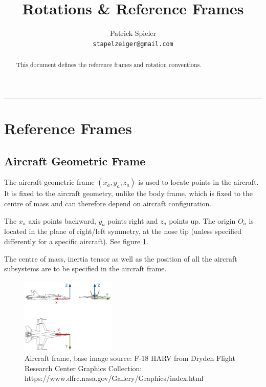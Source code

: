 \documentclass[a4paper]{paper}
\author{
Patrick Spieler \\
\texttt{stapelzeiger@gmail.com}
}
\title{Rotations \& Reference Frames}
\begin{document}
\maketitle
\hrule
\bigskip


\begin{abstract}

This document defines the reference frames and rotation conventions.

\end{abstract}

\tableofcontents

\pagebreak

\section{Reference Frames}

\subsection{Aircraft Geometric Frame}

The aircraft geometric frame $(x_a, y_a, z_a)$ is used to locate points in the aircraft.
It is fixed to the aircraft geometry, unlike the body frame, which is fixed to the centre of mass and can therefore depend on aircraft configuration.

The $x_a$ axis points backward, $y_a$ points right and $z_a$ points up.
The origin $O_a$ is located in the plane of right/left symmetry, at the nose tip (unless specified differently for a specific aircraft). See figure \ref{fig:aircraft_frame}.

The centre of mass, inertia tensor as well as the position of all the aircraft subsystems are to be specified in the aircraft frame.

\begin{figure}[h]
\centering
\includegraphics[width=0.4\textwidth]{img/aircraft_frame.pdf}
\caption{Aircraft frame, base image source: F-18 HARV from Dryden Flight Research Center Graphics Collection: https://www.dfrc.nasa.gov/Gallery/Graphics/index.html}
\label{fig:aircraft_frame}
\end{figure}
\end{document}
